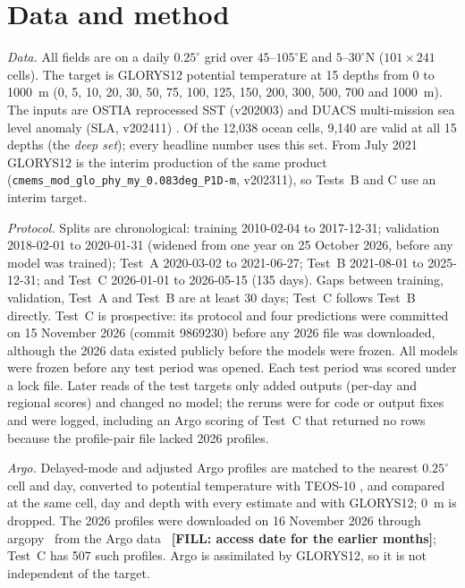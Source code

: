 
\section{Data and method}
\label{sec:data}
\emph{Data.} All fields are on a daily $0.25^\circ$ grid over $45$--$105^\circ$E and $5$--$30^\circ$N ($101\times241$ cells). The target is GLORYS12 potential temperature \cite{glorys12} at 15 depths from 0 to 1000~m (0, 5, 10, 20, 30, 50, 75, 100, 125, 150, 200, 300, 500, 700 and 1000~m). The inputs are OSTIA reprocessed SST (v202003) \cite{ostia} and DUACS multi-mission sea level anomaly (SLA, v202411) \cite{duacs}. Of the 12,038 ocean cells, 9,140 are valid at all 15 depths (the \emph{deep set}); every headline number uses this set. From July 2021 GLORYS12 is the interim production of the same product (\texttt{cmems\_mod\_glo\_phy\_my\_0.083deg\_P1D-m}, v202311), so Tests~B and C use an interim target.

\emph{Protocol.} Splits are chronological: training 2010-02-04 to 2017-12-31; validation 2018-02-01 to 2020-01-31 (widened from one year on 25 October 2026, before any model was trained); Test~A 2020-03-02 to 2021-06-27; Test~B 2021-08-01 to 2025-12-31; and Test~C 2026-01-01 to 2026-05-15 (135 days). Gaps between training, validation, Test~A and Test~B are at least 30 days; Test~C follows Test~B directly. Test~C is prospective: its protocol and four predictions were committed on 15 November 2026 (commit 9869230) before any 2026 file was downloaded, although the 2026 data existed publicly before the models were frozen. All models were frozen before any test period was opened. Each test period was scored under a lock file. Later reads of the test targets only added outputs (per-day and regional scores) and changed no model; the reruns were for code or output fixes and were logged, including an Argo scoring of Test~C that returned no rows because the profile-pair file lacked 2026 profiles.

\emph{Argo.} Delayed-mode and adjusted Argo profiles are matched to the nearest $0.25^\circ$ cell and day, converted to potential temperature with TEOS-10 \cite{teos10}, and compared at the same cell, day and depth with every estimate and with GLORYS12; 0~m is dropped. The 2026 profiles were downloaded on 16 November 2026 through argopy~\cite{argopy} from the Argo data~\cite{argo} \textbf{[FILL: access date for the earlier months]}; Test~C has 507 such profiles. Argo is assimilated by GLORYS12, so it is not independent of the target.


